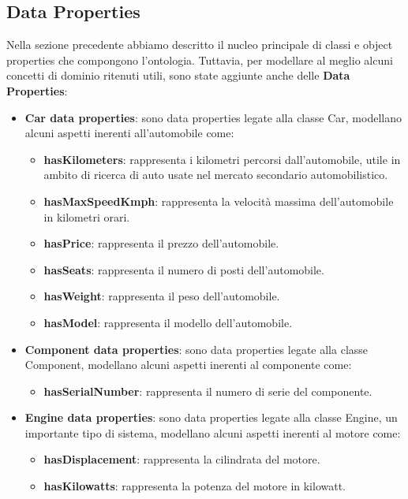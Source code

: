 \subsection{Data Properties}
Nella sezione precedente abbiamo descritto il nucleo principale di classi e object properties che compongono l'ontologia. Tuttavia, per modellare al meglio alcuni concetti di dominio ritenuti utili, sono state aggiunte anche delle \textbf{Data Properties}:\\

\begin{itemize}
    \item \textbf{Car data properties}: sono data properties legate alla classe Car, modellano alcuni aspetti inerenti all'automobile come:
          \begin{itemize}
              \item \textbf{hasKilometers}: rappresenta i kilometri percorsi dall'automobile, utile in ambito di ricerca di auto usate nel mercato secondario automobilistico.
              \item \textbf{hasMaxSpeedKmph}: rappresenta la velocità massima dell'automobile in kilometri orari.
              \item \textbf{hasPrice}: rappresenta il prezzo dell'automobile.
              \item \textbf{hasSeats}: rappresenta il numero di posti dell'automobile.
              \item \textbf{hasWeight}: rappresenta il peso dell'automobile.
              \item \textbf{hasModel}: rappresenta il modello dell'automobile.
          \end{itemize}
    \item \textbf{Component data properties}: sono data properties legate alla classe Component, modellano alcuni aspetti inerenti al componente come:
          \begin{itemize}
              \item \textbf{hasSerialNumber}: rappresenta il numero di serie del componente.
          \end{itemize}
    \item \textbf{Engine data properties}: sono data properties legate alla classe Engine, un importante tipo di sistema, modellano alcuni aspetti inerenti al motore come:
          \begin{itemize}
              \item \textbf{hasDisplacement}: rappresenta la cilindrata del motore.
              \item \textbf{hasKilowatts}: rappresenta la potenza del motore in kilowatt.
          \end{itemize}
\end{itemize}